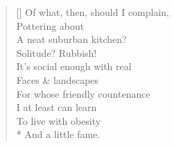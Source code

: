 \documentclass[MAIN]{subfiles}
\begin{document}
\begin{verse}[\versewidth]
Of what, then, should I complain,\\
Pottering about\\
A neat suburban kitchen?\\
Solitude? Rubbish!\\
It's social enough with real\\
Faces \& landscapes\\
For whose friendly countenance\\
I at least can learn\\
To live with obesity\\*
And a little fame.
\end{verse}
\end{document}
